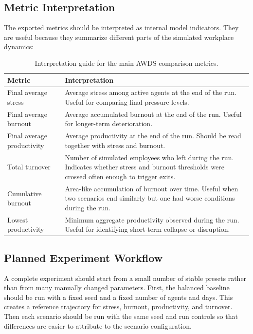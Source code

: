 \documentclass[12pt,a4paper]{article}
\begin{document}
\subsection{Metric Interpretation}

The exported metrics should be interpreted as internal model indicators. They are useful because they summarize different parts of the simulated workplace dynamics:

\begin{table}[ht]
    \centering
    \begin{tabular}{>{\raggedright\arraybackslash}p{}>{\raggedright\arraybackslash}p{}}
        \toprule
        Metric & Interpretation \\
        \midrule
        Final average stress & Average stress among active agents at the end of the run. Useful for comparing final pressure levels. \\
        Final average burnout & Average accumulated burnout at the end of the run. Useful for longer-term deterioration. \\
        Final average productivity & Average productivity at the end of the run. Should be read together with stress and burnout. \\
        Total turnover & Number of simulated employees who left during the run. Indicates whether stress and burnout thresholds were crossed often enough to trigger exits. \\
        Cumulative burnout & Area-like accumulation of burnout over time. Useful when two scenarios end similarly but one had worse conditions during the run. \\
        Lowest productivity & Minimum aggregate productivity observed during the run. Useful for identifying short-term collapse or disruption. \\
        \bottomrule
    \end{tabular}
    \caption{Interpretation guide for the main AWDS comparison metrics.}
\end{table}

\subsection{Planned Experiment Workflow}

A complete experiment should start from a small number of stable presets rather than from many manually changed parameters. First, the balanced baseline should be run with a fixed seed and a fixed number of agents and days. This creates a reference trajectory for stress, burnout, productivity, and turnover. Then each scenario should be run with the same seed and run controls so that differences are easier to attribute to the scenario configuration.
\end{document}
